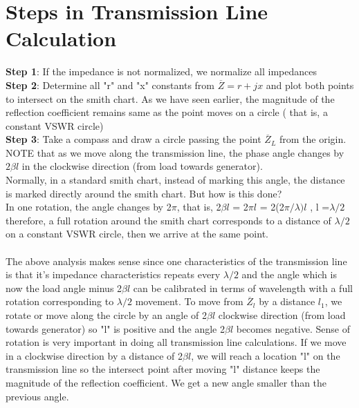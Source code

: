 \section{Steps in Transmission Line Calculation}
\textbf{Step 1}: If the impedance is not normalized, we normalize all impedances\\
\textbf{Step 2}: Determine all "r" and "x" constants from $\overline{Z} = r + jx$ and plot both points to intersect on the smith chart.
As we have seen earlier, the magnitude of the reflection coefficient remains same as the point moves on a circle (
that is, a constant VSWR circle)\\
\textbf{Step 3}: Take a compass and draw a circle passing the point $\overline{Z}_L$ from the origin.\\
NOTE that as we move along the transmission line, the phase angle changes by $2\beta{l}$ in the clockwise direction (from load towards generator).\\
Normally, in a standard smith chart, instead of marking this angle, the distance is marked directly around the smith chart. But how is this done?\\
In one rotation, the angle changes by 2$\pi$, that is, 2$\beta{l}$ = 2$\pi{l}$ = 2(2$\pi/\lambda){l}$ , l =$\lambda/2$ therefore, a full rotation around the smith chart corresponds to a distance of $\lambda/2$ on a constant VSWR circle, then we arrive at the same point.\\\\
 The above analysis makes sense since one characteristics of the transmission line is that it's impedance characteristics repeats every $\lambda/2$ and the angle which is now the load angle minus 2$\beta{l}$ can be calibrated in terms of wavelength with a full rotation corresponding to $\lambda/2$ movement. To move from $\overline{Z}_{l}$ by a distance $l_1$, we rotate or move along the circle by an angle of 2$\beta{l}$ clockwise direction (from load towards generator) so "l" is positive and the angle 2$\beta{l}$ becomes negative. Sense of rotation is very important in doing  all transmission line calculations. If we move in a clockwise direction by a distance of 2$\beta{l}$, we will reach a location "l" on the transmission line so the intersect point after moving "l" distance keeps the magnitude of the reflection coefficient. We get a new angle smaller than the previous angle.\\

